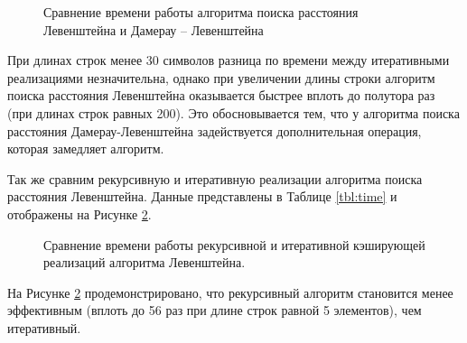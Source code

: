 \begin{figure}[ht]
	\centering
	\captionsetup{justification=centering}
	\caption{Сравнение времени работы алгоритма поиска расстояния Левенштейна и Дамерау -- Левенштейна}
	\label{plt:time_levenshtein}
\end{figure}

При длинах строк менее 30 символов разница по времени  между итеративными реализациями незначительна, однако при увеличении длины строки алгоритм поиска расстояния Левенштейна оказывается быстрее вплоть до полутора раз (при длинах строк равных 200). Это обосновывается тем, что у алгоритма поиска расстояния Дамерау-Левенштейна задействуется дополнительная операция, которая замедляет алгоритм.\newline


Так же сравним рекурсивную и итеративную реализации алгоритма поиска расстояния Левенштейна. Данные представлены в Таблице \ref{tbl:time} и отображены на Рисунке \ref{plt:time_levenshtein_cmp}.

\begin{figure}[ht]
	\centering
	\captionsetup{justification=centering}
	\caption{Сравнение времени работы рекурсивной и итеративной кэширующей реализаций алгоритма Левенштейна.}
	\label{plt:time_levenshtein_cmp}
\end{figure}

На Рисунке \ref{plt:time_levenshtein_cmp} продемонстрировано, что рекурсивный алгоритм становится менее эффективным (вплоть до 56 раз при длине строк равной 5 элементов), чем итеративный.

